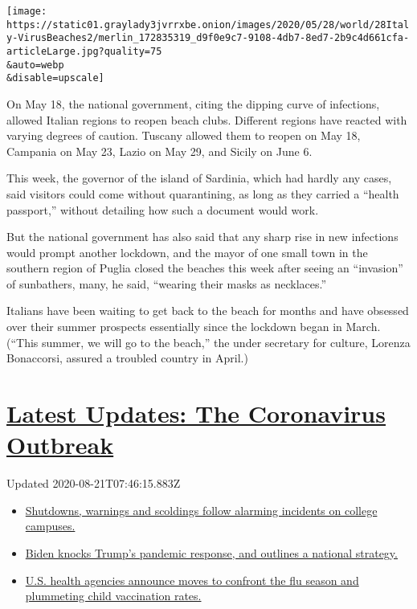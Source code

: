 \texttt{[image: https://static01.graylady3jvrrxbe.onion/images/2020/05/28/world/28Italy-VirusBeaches2/merlin\_172835319\_d9f0e9c7-9108-4db7-8ed7-2b9c4d661cfa-articleLarge.jpg?quality=75\\\&auto=webp\\\&disable=upscale]}

On May 18, the national government, citing the dipping curve of
infections, allowed Italian regions to reopen beach clubs. Different
regions have reacted with varying degrees of caution. Tuscany allowed
them to reopen on May 18, Campania on May 23, Lazio on May 29, and
Sicily on June 6.

This week, the governor of the island of Sardinia, which had hardly any
cases, said visitors could come without quarantining, as long as they
carried a ``health passport,'' without detailing how such a document
would work.

But the national government has also said that any sharp rise in new
infections would prompt another lockdown, and the mayor of one small
town in the southern region of Puglia closed the beaches this week after
seeing an ``invasion'' of sunbathers, many, he said, ``wearing their
masks as necklaces.''

Italians have been waiting to get back to the beach for months and have
obsessed over their summer prospects essentially since the lockdown
began in March. (``This summer, we will go to the beach,'' the under
secretary for culture, Lorenza Bonaccorsi, assured a troubled country in
April.)

\hypertarget{latest-updates-the-coronavirus-outbreak}{%
\section{\texorpdfstring{\href{https://www.nytimes3xbfgragh.onion/2020/08/20/world/coronavirus-covid.html?action=click\&pgtype=Article\&state=default\&region=MAIN_CONTENT_1\&context=storylines_live_updates}{Latest
Updates: The Coronavirus
Outbreak}}{Latest Updates: The Coronavirus Outbreak}}\label{latest-updates-the-coronavirus-outbreak}}

Updated 2020-08-21T07:46:15.883Z

\begin{itemize}
\tightlist
\item
  \href{https://www.nytimes3xbfgragh.onion/2020/08/20/world/coronavirus-covid.html?action=click\&pgtype=Article\&state=default\&region=MAIN_CONTENT_1\&context=storylines_live_updates\#link-68774d88}{Shutdowns,
  warnings and scoldings follow alarming incidents on college campuses.}
\item
  \href{https://www.nytimes3xbfgragh.onion/2020/08/20/world/coronavirus-covid.html?action=click\&pgtype=Article\&state=default\&region=MAIN_CONTENT_1\&context=storylines_live_updates\#link-26b58724}{Biden
  knocks Trump's pandemic response, and outlines a national strategy.}
\item
  \href{https://www.nytimes3xbfgragh.onion/2020/08/20/world/coronavirus-covid.html?action=click\&pgtype=Article\&state=default\&region=MAIN_CONTENT_1\&context=storylines_live_updates\#link-4e542da3}{U.S.
  health agencies announce moves to confront the flu season and
  plummeting child vaccination rates.}
\end{itemize}

